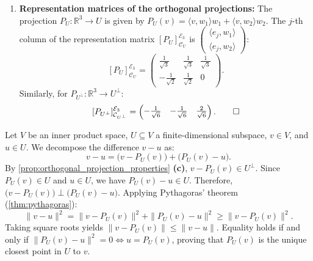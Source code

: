 \begin{exercisesolution*}
\begin{enumerate}[label=\textbf{(\alph*)}]
    \item \textbf{Representation matrices of the orthogonal projections:}
    The projection $P_U \colon \mathbb{R}^3 \to U$ is given by $P_U(v) = \langle v, w_1 \rangle w_1 + \langle v, w_2 \rangle w_2$.
    The $j$-th column of the representation matrix $[P_U]_{\mathcal{C}_U}^{\mathcal{E}_3}$ is $\left(\begin{smallmatrix} \langle e_j, w_1 \rangle \\ \langle e_j, w_2 \rangle \end{smallmatrix}\right)$:
    \[
    [P_U]_{\mathcal{C}_U}^{\mathcal{E}_3} = \begin{pmatrix}
      \frac{1}{\sqrt{3}} & \frac{1}{\sqrt{3}} & \frac{1}{\sqrt{3}} \\
      -\frac{1}{\sqrt{2}} & \frac{1}{\sqrt{2}} & 0
    \end{pmatrix}.
    \]
    Similarly, for $P_{U^\perp} \colon \mathbb{R}^3 \to U^\perp$:
    \[
    [P_{U^\perp}]_{\mathcal{C}_{U^\perp}}^{\mathcal{E}_3} = \begin{pmatrix}
      -\frac{1}{\sqrt{6}} & -\frac{1}{\sqrt{6}} & \frac{2}{\sqrt{6}}
    \end{pmatrix}. \qedhere
    \]
\end{enumerate}
\end{exercisesolution*}

\begin{exercisesolution}
\label{sol:best_approximation_subspace}
Let $V$ be an inner product space, $U \subseteq V$ a finite-dimensional subspace, $v \in V$, and $u \in U$.
We decompose the difference $v - u$ as:
\[
v - u = \big(v - P_U(v)\big) + \big(P_U(v) - u\big).
\]
By \cref{prop:orthogonal_projection_properties} \textbf{(c)}, $v - P_U(v) \in U^\perp$.
Since $P_U(v) \in U$ and $u \in U$, we have $P_U(v) - u \in U$.
Therefore, $\big(v - P_U(v)\big) \perp \big(P_U(v) - u\big)$.
Applying Pythagoras' theorem (\cref{thm:pythagoras}):
\[
\|v - u\|^2 = \|v - P_U(v)\|^2 + \|P_U(v) - u\|^2 \ge \|v - P_U(v)\|^2.
\]
Taking square roots yields $\|v - P_U(v)\| \le \|v - u\|$.
Equality holds if and only if $\|P_U(v) - u\|^2 = 0 \iff u = P_U(v)$, proving that $P_U(v)$ is the unique closest point in $U$ to $v$.
\end{exercisesolution}

